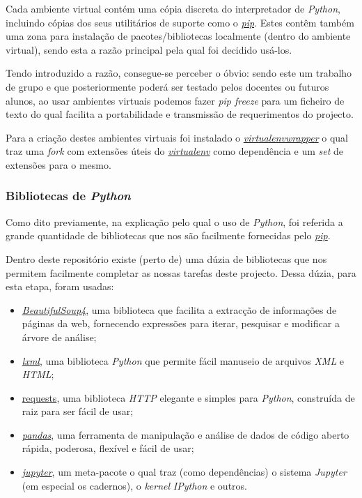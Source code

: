Cada ambiente virtual contém uma cópia discreta do interpretador de \textit{Python}, incluindo cópias dos seus utilitários de suporte como o \href{https://pypi.org/project/pip/}{\textit{pip}}. Estes contêm também uma zona para instalação de pacotes/bibliotecas localmente (dentro do ambiente virtual), sendo esta a razão principal pela qual foi decidido usá-los.

Tendo introduzido a razão, consegue-se perceber o óbvio: sendo este um trabalho de grupo e que posteriormente poderá ser testado pelos docentes ou futuros alunos, ao usar ambientes virtuais podemos fazer \textit{pip freeze} para um ficheiro de texto do qual facilita a portabilidade e transmissão de requerimentos do projecto.

Para a criação destes ambientes virtuais foi instalado o \href{https://pypi.org/project/virtualenvwrapper/}{\textit{virtualenvwrapper}} o qual traz uma \textit{fork} com extensões úteis do \href{https://pypi.org/project/virtualenv/}{\textit{virtualenv}} como dependência e um \textit{set} de extensões para o mesmo.

\subsubsection{Bibliotecas de \textit{Python}}
Como dito previamente, na explicação pelo qual o uso de \textit{Python}, foi referida a grande quantidade de bibliotecas que nos são facilmente fornecidas pelo \href{https://pypi.org/project/pip/}{\textit{pip}}.

Dentro deste repositório existe (perto de) uma dúzia de bibliotecas que nos permitem facilmente completar as nossas tarefas deste projecto. Dessa dúzia, para esta etapa, foram usadas:
\begin{itemize}
  \setlength\itemsep{0.05em}
  \item \href{https://pypi.org/project/beautifulsoup4/}{\textit{BeautifulSoup4}}, uma biblioteca que facilita a extracção de informações de páginas da web, fornecendo expressões para iterar, pesquisar e modificar a árvore de análise;
  \item \href{https://pypi.org/project/lxml/}{\textit{lxml}}, uma biblioteca \textit{Python} que permite fácil manuseio de arquivos \textit{XML} e \textit{HTML};
  \item \href{https://pypi.org/project/requests/}{requests}, uma biblioteca \textit{HTTP} elegante e simples para \textit{Python}, construída de raiz para ser fácil de usar;
  \item \href{https://pypi.org/project/pandas/}{\textit{pandas}}, uma ferramenta de manipulação e análise de dados de código aberto rápida, poderosa, flexível e fácil de usar;
  \item \href{https://pypi.org/project/jupyter/}{\textit{jupyter}}, um meta-pacote o qual traz (como dependências) o sistema \textit{Jupyter} (em especial os cadernos), o \textit{kernel} \textit{IPython} e outros.
\end{itemize}

